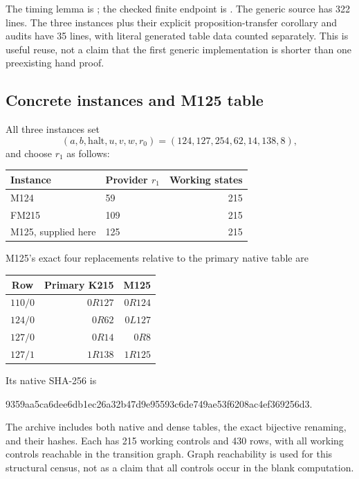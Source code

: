 The timing lemma is ; the checked finite endpoint
is . The generic source has 322 lines. The three
instances plus their explicit proposition-transfer corollary and audits
have 35 lines, with literal generated table data counted separately. This
is useful reuse, not a claim that the first generic implementation is
shorter than one preexisting hand proof.

\subsection{Concrete instances and M125 table}

All three instances set
\[
 (a,b,\mathrm{halt},u,v,w,r_0)=(124,127,254,62,14,138,8),
\]
and choose \(r_1\) as follows:
\begin{center}
\begin{tabular}{@{}llr@{}}\toprule
Instance & Provider $r_1$ & Working states\\\midrule
M124 & 59 & 215\\
FM215 & 109 & 215\\
M125, supplied here & 125 & 215\\\bottomrule
\end{tabular}
\end{center}

M125's exact four replacements relative to the primary native table are
\begin{center}
\begin{tabular}{@{}crr@{}}\toprule
Row & Primary K215 & M125\\\midrule
$110/0$ & $0R127$ & $0R124$\\
$124/0$ & $0R62$ & $0L127$\\
$127/0$ & $0R14$ & $0R8$\\
$127/1$ & $1R138$ & $1R125$\\\bottomrule
\end{tabular}
\end{center}
Its native SHA-256 is
\begin{center}\small\ttfamily
9359aa5ca6dee6db1ec26a32b47d9e95593c6de749ae53f6208ac4ef369256d3.
\end{center}
The archive includes both native and dense tables, the exact bijective
renaming, and their hashes. Each has 215 working controls and 430 rows,
with all working controls reachable in the transition graph. Graph
reachability is used for this structural census, not as a claim that all
controls occur in the blank computation.

